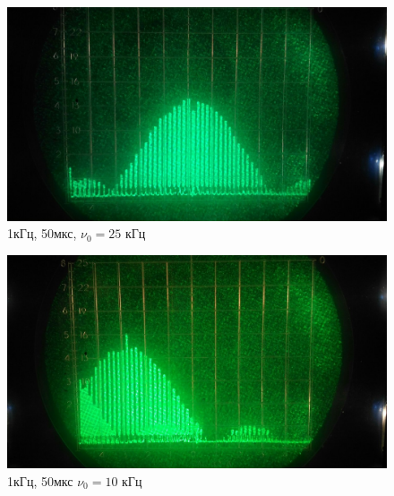 \documentclass[a4paper,12pt]{article}
\begin{document}
		\begin{figure}[h!]
			\begin{minipage}[h]{0.49\linewidth}
				\centering
				\includegraphics[width=0.9\linewidth]{pic6} \\ 1кГц, 50мкс, $\nu_0 = 25$ кГц
			\end{minipage}
			\hfill
			\begin{minipage}[h]{0.49\linewidth}
				\centering
				\includegraphics[width=0.9\linewidth]{pic7} \\ 1кГц, 50мкс $\nu_0 = 10$ кГц
			\end{minipage}
		\end{figure}
		
\end{document}
